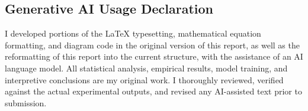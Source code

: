 \subsection*{Generative AI Usage Declaration}
I developed portions of the LaTeX typesetting, mathematical equation formatting, and diagram code in the original version of this report, as well as the reformatting of this report into the current structure, with the assistance of an AI language model. All statistical analysis, empirical results, model training, and interpretive conclusions are my original work. I thoroughly reviewed, verified against the actual experimental outputs, and revised any AI-assisted text prior to submission.